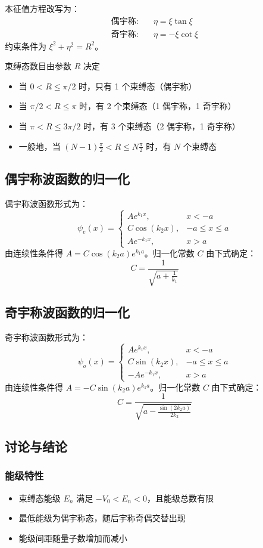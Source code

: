 本征值方程改写为：
\begin{align*}
	\text{偶宇称:} & \quad \eta = \xi \tan \xi \\
	\text{奇宇称:} & \quad \eta = -\xi \cot \xi
\end{align*}
约束条件为 $\xi^2 + \eta^2 = R^2$。

束缚态数目由参数 $R$ 决定
\begin{itemize}
	\item 当 $0 < R \leq \pi/2$ 时，只有 1 个束缚态（偶宇称）
	\item 当 $\pi/2 < R \leq \pi$ 时，有 2 个束缚态（1 偶宇称，1 奇宇称）
	\item 当 $\pi < R \leq 3\pi/2$ 时，有 3 个束缚态（2 偶宇称，1 奇宇称）
	\item 一般地，当 $\displaystyle (N-1)\frac{\pi}{2} < R \leq N\frac{\pi}{2}$ 时，有 $N$ 个束缚态
\end{itemize}

\subsection*{偶宇称波函数的归一化}
偶宇称波函数形式为：
\[
\psi_e(x) = 
\begin{cases}
	A e^{k_1 x}, & x < -a \\
	C \cos(k_2 x), & -a \le x \le a \\
	A e^{-k_1 x}, & x > a
\end{cases}
\]
由连续性条件得 $A = C \cos(k_2 a) e^{k_1 a}$。归一化常数 $C$ 由下式确定：
\[
C = \frac{1}{\sqrt{a + \frac{1}{k_1}}}
\]

\subsection*{奇宇称波函数的归一化}
奇宇称波函数形式为：
\[
\psi_o(x) = 
\begin{cases}
	A e^{k_1 x}, & x < -a \\
	C \sin(k_2 x), & -a \le x \le a \\
	-A e^{-k_1 x}, & x > a
\end{cases}
\]
由连续性条件得 $A = -C \sin(k_2 a) e^{k_1 a}$。归一化常数 $C$ 由下式确定：
\[
C = \frac{1}{\sqrt{a - \frac{\sin(2k_2 a)}{2k_2}}}
\]

\subsection*{讨论与结论}

\subsubsection*{能级特性}
\begin{itemize}
	\item 束缚态能级 $E_n$ 满足 $-V_0 < E_n < 0$，且能级总数有限
	\item 最低能级为偶宇称态，随后宇称奇偶交替出现
	\item 能级间距随量子数增加而减小
\end{itemize}

